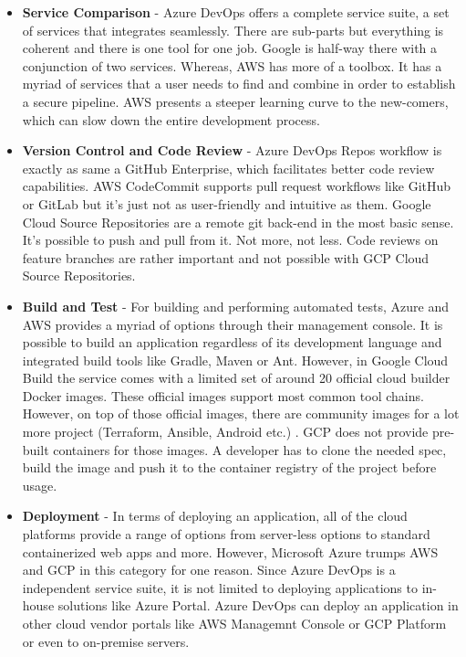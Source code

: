 \begin{itemize}
    \item \textbf{Service Comparison} -  Azure DevOps offers a complete service suite, a set of services that integrates seamlessly. There are sub-parts but everything is coherent and there is one tool for one job. Google is half-way there with a conjunction of two services. Whereas, AWS has more of a toolbox. It has a myriad of services that a user needs to find and combine in order to establish a secure pipeline. AWS presents a steeper learning curve to the new-comers, which can slow down the entire development process.
    \item \textbf{Version Control and Code Review} - Azure DevOps Repos workflow is exactly as same a GitHub Enterprise, which facilitates better code review capabilities. AWS CodeCommit supports pull request workflows like GitHub or GitLab but it’s just not as user-friendly and intuitive as them. Google Cloud Source Repositories are a remote git back-end in the most basic sense. It's possible to push and pull from it. Not more, not less. Code reviews on feature branches are rather important and not possible with GCP Cloud Source Repositories.
    \item \textbf{Build and Test} - For building and performing automated tests, Azure and AWS provides a myriad of options through their management console. It is possible to build an application regardless of its development language and integrated build tools like Gradle, Maven or Ant. However, in Google Cloud Build the service comes with a limited set of around 20 official cloud builder Docker images. These official images support most common tool chains. However, on top of those official images, there are community images for a lot more project (Terraform, Ansible, Android etc.) . GCP does not provide pre-built containers for those images. A developer has to clone the needed spec, build the image and push it to the container registry of the project before usage. 
    \item \textbf{Deployment} - In terms of deploying an application, all of the cloud platforms provide a range of options from server-less options to standard containerized web apps and more. However, Microsoft Azure trumps AWS and GCP in this category for one reason. Since Azure DevOps is a independent service suite, it is not limited to deploying applications to in-house solutions like Azure Portal. Azure DevOps can deploy an application in other cloud vendor portals like AWS Managemnt Console or GCP Platform or even to on-premise servers.
\end{itemize}

